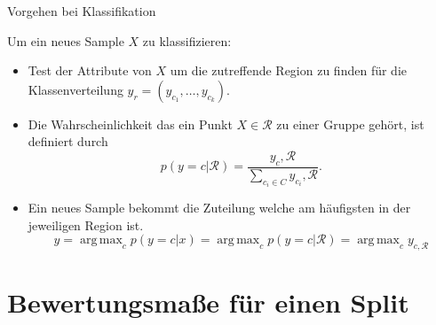 \documentclass{beamer}
\DeclareMathOperator*{\argmax}{arg\,max}
\begin{document}
\begin{frame}{Vorgehen bei Klassifikation}

Um ein neues Sample $X$ zu klassifizieren:
	\begin{itemize}
		\item Test der Attribute von $X$ um die zutreffende Region zu finden für die Klassenverteilung $y_r = (y_{c_1}, \ldots, y_{c_k})$.
		\item Die Wahrscheinlichkeit das ein Punkt $X \in \mathcal{R}$ zu einer Gruppe gehört, ist definiert durch
			\[p(y = c | \mathcal{R}) = \frac{y_c, \mathcal{R}}{\sum_{c_i \in C} y_{c_i}, \mathcal{R}}.\]
		\item Ein neues Sample bekommt die Zuteilung welche am häufigsten in der jeweiligen Region ist.
			\[\hat{y} = \argmax_c p(y = c | x) = \argmax_c p(y = c | \mathcal{R}) = \argmax_c y_{c,\mathcal{R}}\]
	\end{itemize}
\end{frame}



\section{Bewertungsmaße für einen Split}
\end{document}
